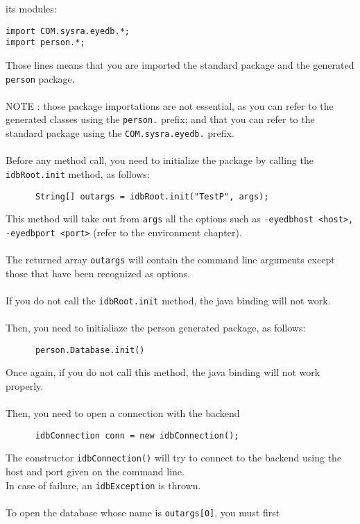 its modules:
{\verbsize \begin{verbatim}
import COM.sysra.eyedb.*;
import person.*;
\end{verbatim}
}
Those lines means that you are imported the standard \eyedb package
and the generated \texttt{person} package.
\\
\\
NOTE : those package importations are not essential, as you can refer to the
generated classes using the \texttt{person.} prefix; and that you can refer
to the standard \eyedb package using the \texttt{COM.sysra.eyedb.} prefix.
\\
\\
Before any \eyedb method call, you need to initialize the \eyedb
package by calling the \texttt{idbRoot.init} method, as follows:
{\verbsize \begin{verbatim}
      String[] outargs = idbRoot.init("TestP", args);
\end{verbatim}
}
This method will take out from \texttt{args} all the \eyedb options
such as \texttt{-eyedbhost <host>, -eyedbport <port>}
(refer to the environment chapter).
\\
\\
The returned array \texttt{outargs} will contain the command line arguments
except those that have been recognized as \eyedb options.
\\
\\
If you do not call the \texttt{idbRoot.init} method, the \eyedb java binding
will not work.
\\
\\
Then, you need to initialiaze the person generated package, as follows:
{\verbsize \begin{verbatim}
      person.Database.init()
\end{verbatim}
}
Once again, if you do not call this method, the \eyedb java binding will
not work properly.
\\
\\
Then, you need to open a connection with the \eyedb backend
{\verbsize \begin{verbatim}
      idbConnection conn = new idbConnection();
\end{verbatim}
}
The constructor \texttt{idbConnection()} will try to connect to the backend
using the host and port given on the command line.
\\
In case of failure, an \texttt{idbException} is thrown.
\\
\\
To open the database whose name is \texttt{outargs[0]}, you must first
